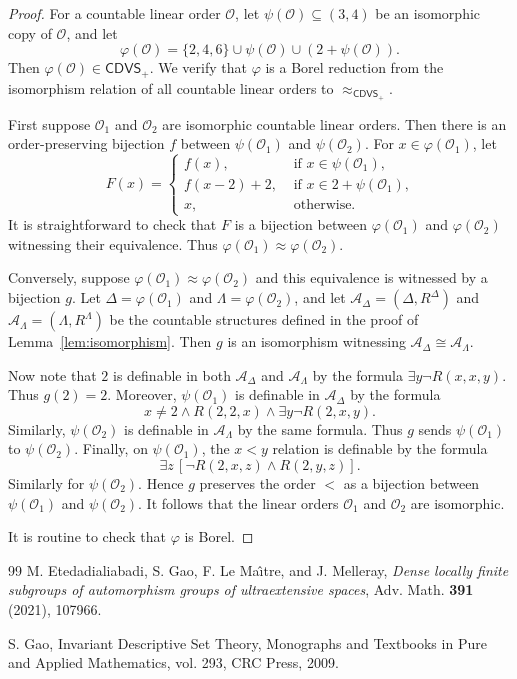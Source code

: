 \documentclass[10pt,a4paper]{amsart}
\theoremstyle{definition}
\theoremstyle{remark}
\begin{document}
\begin{proof}
For a countable linear order $\mathcal{O}$, let $\psi(\mathcal{O})\subseteq (3,4)$  be an isomorphic copy of $\mathcal{O}$, and let 
$$\varphi(\mathcal{O})=\{2,4,6\}\cup\psi(\mathcal{O})\cup(2+\psi(\mathcal{O})). $$
Then $\varphi(\mathcal{O})\in \mathsf{CDVS}_+$. We verify that $\varphi$ is a Borel reduction from the isomorphism relation of all countable linear orders to $\approx_{\mathsf{CDVS}_+}$.

First suppose $\mathcal{O}_1$ and $\mathcal{O}_2$ are isomorphic countable linear orders. Then there is an order-preserving bijection $f$ between $\psi(\mathcal{O}_1)$ and $\psi(\mathcal{O}_2)$. For $x\in\varphi(\mathcal{O}_1)$, let 
$$F(x)=\left\{\begin{array}{ll} f(x),  & \mbox{ if $x\in\psi(\mathcal{O}_1)$,} \\
f(x-2)+2, & \mbox{ if $x\in 2+\psi(\mathcal{O}_1)$,} \\
x, & \mbox{ otherwise.}
\end{array}\right.
$$
It is straightforward to check that $F$ is a bijection between $\varphi(\mathcal{O}_1)$ and $\varphi(\mathcal{O}_2)$ witnessing their equivalence. Thus $\varphi(\mathcal{O}_1)\approx \varphi(\mathcal{O}_2)$.

Conversely, suppose $\varphi(\mathcal{O}_1)\approx \varphi(\mathcal{O}_2)$ and this equivalence is witnessed by a bijection $g$. Let $\Delta=\varphi(\mathcal{O}_1)$ and $\Lambda=\varphi(\mathcal{O}_2)$, and let $\mathcal{A}_\Delta=(\Delta, R^\Delta)$ and $\mathcal{A}_\Lambda=(\Lambda, R^\Lambda)$ be the countable structures defined in the proof of Lemma~\ref{lem:isomorphism}.  Then $g$ is an isomorphism witnessing $\mathcal{A}_\Delta\cong \mathcal{A}_\Lambda$. 

Now note that $2$ is definable in both $\mathcal{A}_\Delta$ and $\mathcal{A}_\Lambda$ by the formula $\exists y\neg R(x, x, y)$. Thus $g(2)=2$. 
Moreover, $\psi(\mathcal{O}_1)$ is definable in $\mathcal{A}_\Delta$ by the formula 
$$ x\neq 2\wedge R(2, 2, x) \wedge \exists y\neg R(2,x,y). $$
Similarly, $\psi(\mathcal{O}_2)$ is definable in $\mathcal{A}_\Lambda$ by the same formula. Thus $g$ sends $\psi(\mathcal{O}_1)$ to $\psi(\mathcal{O}_2)$. Finally, on $\psi(\mathcal{O}_1)$, the $x<y$ relation is definable by the formula
$$ \exists z\, [\neg R(2, x, z) \wedge R(2,y,z)]. $$
Similarly for $\psi(\mathcal{O}_2)$. Hence $g$ preserves the order $<$ as a bijection between $\psi(\mathcal{O}_1)$ and $\psi(\mathcal{O}_2)$. It follows that the linear orders $\mathcal{O}_1$ and $\mathcal{O}_2$ are isomorphic.

It is routine to check that $\varphi$ is Borel.
\end{proof}

\begin{thebibliography}{99}
M. Etedadialiabadi, S. Gao, F. Le Ma\^{\i}tre, and J. Melleray,
\textit{Dense locally finite subgroups of automorphism groups of ultraextensive spaces},
Adv. Math. {\bf 391} (2021), 107966.


S. Gao,
Invariant Descriptive Set Theory,
Monographs and Textbooks in Pure and Applied Mathematics, vol. 293,
CRC Press, 2009.

\end{thebibliography}
\end{document}
